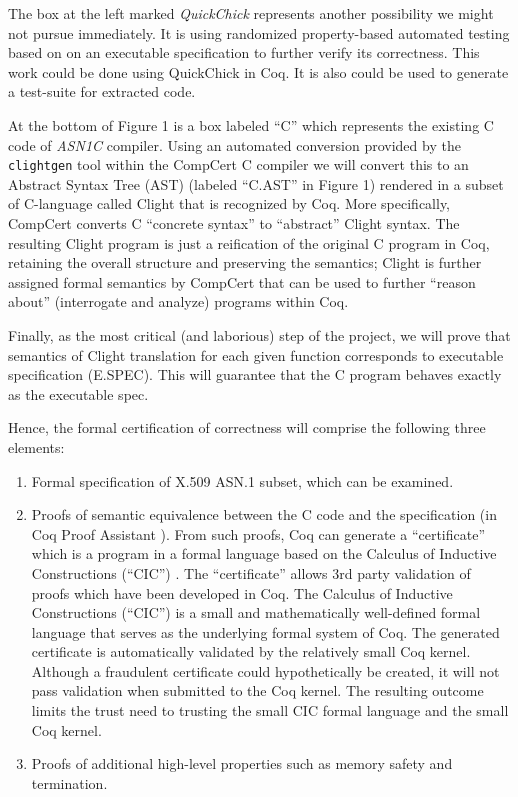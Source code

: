 \documentclass[acmsmall,nonacm]{acmart}
\begin{document}
The box at the left marked \textit{QuickChick} represents another
possibility we might not pursue immediately. It is using randomized
property-based automated testing based on on an executable
specification to further verify its correctness. This work could be
done using QuickChick \cite{QuickChick} in Coq. It is also could be used
to generate a test-suite for extracted code.

At the bottom of Figure 1 is a box labeled ``C'' which represents the
existing C code of \emph{ASN1C} compiler. Using an automated conversion
provided by the \texttt{clightgen} tool within the CompCert C compiler
\cite{CompCert} we will convert this to an Abstract Syntax Tree (AST)
\cite{AST} (labeled ``C.AST'' in Figure 1) rendered in a subset
of C-language called Clight \cite{Mechanized} that is recognized by Coq. More specifically,
CompCert converts C ``concrete syntax'' to ``abstract'' Clight
syntax. The resulting Clight program is just a reification of the
original C program in Coq, retaining the overall structure and
preserving the semantics; Clight is further assigned formal semantics
by CompCert that can be used to further ``reason about'' (interrogate
and analyze) programs within Coq.

Finally, as the most critical (and laborious) step of the project, we
will prove that semantics of Clight
translation for each given function corresponds to executable
specification (E.SPEC). This will guarantee that the C program behaves exactly
as the executable spec.

Hence, the formal certification of correctness will comprise the following
three elements:

\begin{enumerate}[label=(\alph*)]

\item Formal specification of X.509 ASN.1 subset, which can be examined.

\item Proofs of semantic equivalence between the C code and the
  specification (in Coq Proof Assistant \cite{Coq}). From such
  proofs, Coq can generate a ``certificate'' which is a program in a
  formal language based on the Calculus of Inductive Constructions
  (``CIC'') \cite{CIC}. The ``certificate'' allows 3rd party
  validation of proofs which have been developed in Coq. The Calculus
  of Inductive Constructions (``CIC'') is a small and mathematically
  well-defined formal language that serves as the underlying formal
  system of Coq. The generated certificate is automatically validated
  by the relatively small Coq kernel. Although a fraudulent
  certificate could hypothetically be created, it will not pass
  validation when submitted to the Coq kernel. The resulting outcome
  limits the trust need to trusting the small CIC formal language and
  the small Coq kernel.

\item Proofs of additional high-level properties such as memory safety
  and termination.

\end{enumerate}
  
\end{document}

